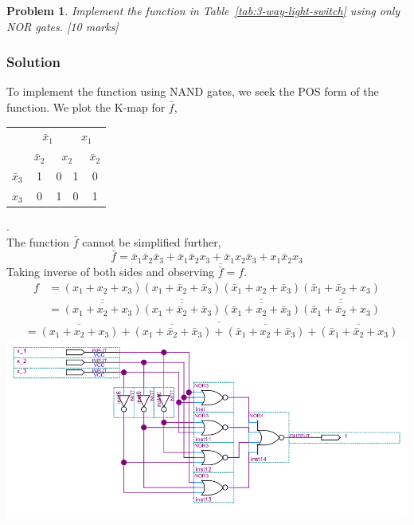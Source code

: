 \documentclass[twocolumn]{article}
\newtheorem{prob}{Problem}
\newcommand{\bx}{\bar{x}}
\begin{document}
\begin{prob}
 Implement the function in Table~\ref{tab:3-way-light-switch} using only NOR
 gates. [10 marks]
\end{prob}
\subsubsection*{Solution}
To implement the function using NAND gates, we seek the POS form of the
function. We plot the K-map for $\bar{f}$,
\\
\begin{tabular}{c|c|c|c|c}
  \toprule
  & \multicolumn{2}{c|}{$\bx_1$} & \multicolumn{2}{c}{$x_1$}
  \\
  & $\bx_2$ & \multicolumn{2}{c|}{$x_2$} & $\bx_2$
  \\ \midrule
  $\bx_3$
  & 1 & 0 & 1 & 0
  \\
  $x_3$
  & 0 & 1 & 0 & 1
  \\\bottomrule
\end{tabular}.
\\
The function $\bar{f}$ cannot be simplified further,
\[
  \bar{f} = \bx_1 \bx_2 \bx_3  + \bx_1 \bx_2 x_3  + \bx_1 x_2 \bx_3 + x_1 \bx_2 x_3
\]
Taking inverse of both sides and observing $\overline{\bar{f}} = f$.
{\tiny
\begin{align*}
  f &= (x_1 + x_2 + x_3)(x_1 + \bx_2 + \bx_3)(\bx_1 + x_2 + \bx_3)(\bx_1 + \bx_2 + x_3)
      \\
    &=\overline{\overline{(x_1 + x_2 + x_3)}}\overline{\overline{(x_1 + \bx_2 + \bx_3)}}\overline{\overline{(\bx_1 + x_2 + \bx_3)}}\overline{\overline{(\bx_1 + \bx_2 + x_3)}}
      \end{align*}
}{\tiny
\begin{align*}
  &=\overline{\overline{{(x_1 + x_2 + x_3)}} + {\overline{(x_1 + \bx_2 + \bx_3)}}
  + {\overline{(\bx_1 + x_2 + \bx_3)}} + {\overline{(\bx_1 + \bx_2 + x_3)}}}
\end{align*}
}
\includegraphics[width=\linewidth]{files/hw2p4.png}
\end{document}
